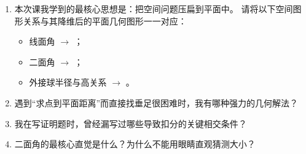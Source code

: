 \documentclass[11pt,a4paper]{ctexart}
\begin{document}
\begin{enumerate}[label=\arabic*. , leftmargin=2em, itemsep=1.5em]
  \item 本次课我学到的最核心思想是：把空间问题压扁到平面中。
  请将以下空间图形关系与其降维后的平面几何图形一一对应：
  \begin{itemize}
    \item 线面角 $\rightarrow$ \blank{6cm}；
    \item 二面角 $\rightarrow$ \blank{6cm}；
    \item 外接球半径与高关系 $\rightarrow$ \blank{6cm}。
  \end{itemize}
  
  \item 遇到“求点到平面距离”而直接找垂足很困难时，我有哪种强力的几何解法？
  
  \vspace{1.2cm}
  
  \item 我在写证明题时，曾经漏写过哪些导致扣分的关键相交条件？
  
  \vspace{1.2cm}
  
  \item 二面角的最核心直觉是什么？为什么不能用眼睛直观猜测大小？
  
  \vspace{1.2cm}
\end{enumerate}
\end{document}
